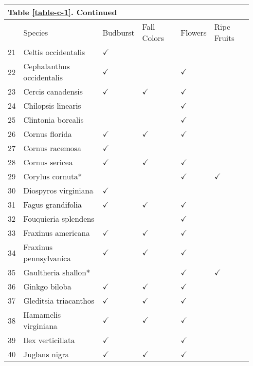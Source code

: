 \begin{table}
\begin{tabularx}{\textwidth}{p{0.5cm}XXXXX}
\multicolumn{3}{l}{Table \ref{table-c-1}. Continued}\\
\hline
& Species & Budburst & Fall Colors & Flowers & Ripe Fruits\\
\hline
21 & Celtis occidentalis & $\checkmark$ &  &  &  \\ 
22 & Cephalanthus occidentalis & $\checkmark$ &  & $\checkmark$ &  \\ 
23 & Cercis canadensis & $\checkmark$ & $\checkmark$ & $\checkmark$ &  \\ 
24 & Chilopsis linearis &  &  & $\checkmark$ &  \\ 
25 & Clintonia borealis &  &  & $\checkmark$ &  \\ 
26 & Cornus florida & $\checkmark$ & $\checkmark$ & $\checkmark$ &  \\ 
27 & Cornus racemosa & $\checkmark$ &  &  &  \\ 
28 & Cornus sericea & $\checkmark$ & $\checkmark$ & $\checkmark$ &  \\ 
29 & Corylus cornuta* &  &  & $\checkmark$ & $\checkmark$ \\ 
30 & Diospyros virginiana & $\checkmark$ &  &  &  \\ 
31 & Fagus grandifolia & $\checkmark$ & $\checkmark$ & $\checkmark$ &  \\ 
32 & Fouquieria splendens &  &  & $\checkmark$ &  \\ 
33 & Fraxinus americana & $\checkmark$ & $\checkmark$ & $\checkmark$ &  \\ 
34 & Fraxinus pennsylvanica & $\checkmark$ & $\checkmark$ & $\checkmark$ &  \\ 
35 & Gaultheria shallon* &  &  & $\checkmark$ & $\checkmark$ \\ 
36 & Ginkgo biloba & $\checkmark$ & $\checkmark$ & $\checkmark$ &  \\ 
37 & Gleditsia triacanthos & $\checkmark$ & $\checkmark$ & $\checkmark$ &  \\ 
38 & Hamamelis virginiana & $\checkmark$ & $\checkmark$ & $\checkmark$ &  \\ 
39 & Ilex verticillata & $\checkmark$ &  & $\checkmark$ &  \\ 
40 & Juglans nigra & $\checkmark$ & $\checkmark$ & $\checkmark$ &  \\ 


\hline
\end{tabularx}
\end{table}

